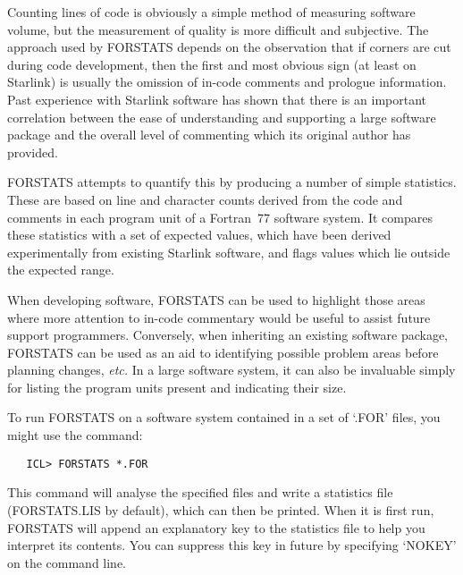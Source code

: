 Counting lines of code is obviously a simple method of measuring software
volume, but the measurement of quality is more difficult and subjective.
The approach used by FORSTATS depends on the observation that if corners are
cut during code development, then the first and most obvious sign (at least
on Starlink) is usually the omission of in-code comments and prologue
information.
Past experience with Starlink software has shown that there is an important
correlation between the ease of understanding and supporting a large
software package and the overall level of commenting which its original
author has provided.

FORSTATS attempts to quantify this by producing a number of simple
statistics.
These are based on line and character counts derived from the code and
comments in each program unit of a Fortran~77 software system.
It compares these statistics with a set of expected values, which have been
derived experimentally from existing Starlink software, and flags values
which lie outside the expected range.

When developing software, FORSTATS can be used to highlight those areas
where more attention to in-code commentary would be useful to assist future
support programmers.
Conversely, when inheriting an existing software package, FORSTATS can be
used as an aid to identifying possible problem areas before planning
changes, {\em etc.}
In a large software system, it can also be invaluable simply for listing the
program units present and indicating their size.

To run FORSTATS on a software system contained in a set of `.FOR' files, you
might use the command:

\begin{verbatim}
   ICL> FORSTATS *.FOR
\end{verbatim}

This command will analyse the specified files and write a statistics file
(FORSTATS.LIS by default), which can then be printed.
When it is first run, FORSTATS will append an explanatory key to the
statistics file to help you interpret its contents.
You can suppress this key in future by specifying `NOKEY' on the command
line.

\newpage
\appendix
